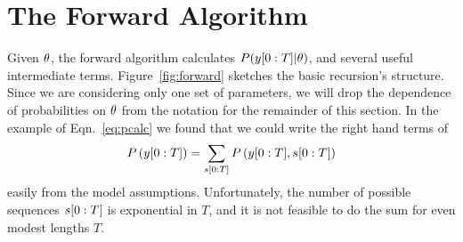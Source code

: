 \section{The Forward Algorithm}
\label{sec:forward}

Given $\theta$, the forward algorithm calculates
$P(y[0:T]|\theta)$, and several useful intermediate terms.
Figure~\ref{fig:forward} sketches the basic recursion's structure.
Since we are considering only one set of parameters, we will drop the
dependence of probabilities on $\theta$ from the notation for the
remainder of this section.  In the example of Eqn.~\eqref{eq:pcalc} we
found that we could write the right hand terms of
\begin{equation*}
   P\left( y[0:T] \right) = \sum_{s[0:T]}
   P\left( y[0:T],s[0:T] \right)
\end{equation*}
easily from the model assumptions.  Unfortunately, the number of
possible sequences $s[0:T]$ is exponential in $T$, and it is
not feasible to do the sum for even modest lengths $T$.

